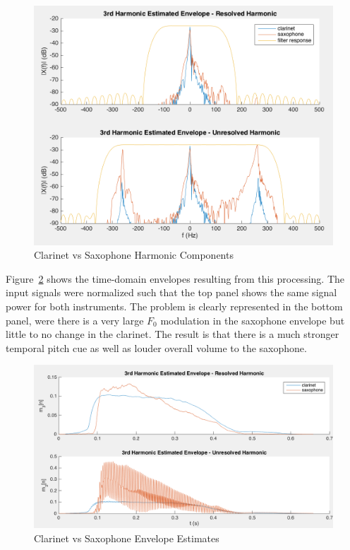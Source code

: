 \documentclass [11pt, proquest,oneside] {ganter_thesis}[2015/03/03]
\begin{document}
\begin{figure}[!ht]
  \centering
    \includegraphics[width=1\textwidth]{clarinetVSsax_F}
    \caption{Clarinet vs Saxophone Harmonic Components}\label{fig:clarinetVSsax_F}
\end{figure}

Figure~\ref{fig:clarinetVSsax_T} shows the time-domain envelopes resulting from this processing.  The input signals were normalized such that the top panel shows the same signal power for both instruments.  The problem is clearly represented in the bottom panel, were there is a very large $F_0$ modulation in the saxophone envelope but little to no change in the clarinet.  The result is that there is a much stronger temporal pitch cue as well as louder overall volume to the saxophone.

\begin{figure}[!ht]
  \centering
    \includegraphics[width=1\textwidth]{clarinetVSsax_T}   
    \caption{Clarinet vs Saxophone Envelope Estimates}\label{fig:clarinetVSsax_T}
\end{figure}
\end{document}
